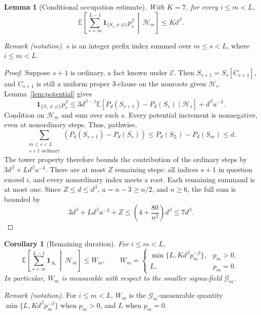 \documentclass[11pt]{article}
\newtheorem{lemma}[theorem]{Lemma}
\newtheorem{corollary}[theorem]{Corollary}
\theoremstyle{remark}
\newcommand{\E}{\mathbb E}
\newcommand{\ind}{\mathbf 1}
\newcommand{\cE}{\mathcal E}
\newcommand{\cG}{\mathcal G}
\newcommand{\cH}{\mathcal H}
\numberwithin{equation}{section}
\begin{document}
\begin{lemma}[Conditional occupation estimate]
\label{lem:occupation}
With $K=7$, for every $i\le m<L$,
\begin{equation}
 \E\left[\sum_{s=m}^{L-1}\ind_{\{S_s\ne\varnothing\}}p_s^\beta
                         \,\middle|\,\cH_m\right]
 \le Kd^\beta.
 \label{eq:occupation}
\end{equation}
\end{lemma}

\noindent\textit{Remark (notation).} $s$ is an integer prefix index summed over $m\le s<L$, where $i\le m<L$.


\begin{proof}
Suppose $s+1$ is ordinary, a fact known under $\cE$.
Then $S_{s+1}=S_s[C_{s+1}]$, and $C_{s+1}$ is still a uniform proper
3-clause on the nonroots given $\cH_s$. Lemma~\ref{lem:potential} gives
\[
 \ind_{\{S_s\ne\varnothing\}}p_s^\beta
 \le3d^{\beta-1}\E[P_d(S_{s+1})-P_d(S_s)\mid\cH_s]
          +d^\beta u^{-3}.
\]
Condition on $\cH_m$ and sum over such $s$. Every potential increment
is nonnegative, even at nonordinary steps. Thus, pathwise,
\[
 \sum_{\substack{m\le s<L\\s+1\text{ ordinary}}}
       (P_d(S_{s+1})-P_d(S_s))
 \le P_d(S_L)-P_d(S_m)\le d.
\]
The tower property therefore bounds the contribution of the ordinary
steps by $3d^\beta+Ld^\beta u^{-3}$.
There are at most $Z$ remaining steps: all indices $s+1$ in question
exceed $i$, and every nonordinary index meets a root.
Each remaining summand is at most one. Since $Z\le d\le d^\beta$,
$u=n-3\ge n/2$, and $n\ge6$, the full sum is bounded by
\[
 3d^\beta+Ld^\beta u^{-3}+Z
 \le \left(4+\frac{80}{n^2}\right)d^\beta\le7d^\beta.
\]
\end{proof}

\begin{corollary}[Remaining duration]
\label{cor:duration}
For $i\le m<L$,
\begin{equation}
 \E\left[\sum_{s=m}^{L-1}\ind_{A_s}\,\middle|\,\cH_m\right]\le W_m,
 \qquad
 W_m=\begin{cases}
 \min\{L,Kd^\beta p_m^{-\beta}\},&p_m>0,\\
 L,&p_m=0.
 \end{cases}
 \label{eq:duration}
\end{equation}
In particular, $W_m$ is measurable with respect to the smaller
sigma-field $\cG_m$.
\end{corollary}

\noindent\textit{Remark (notation).} For $i\le m<L$, $W_m$ is the $\cG_m$-measurable quantity $\min\{L,Kd^\beta p_m^{-\beta}\}$ when $p_m>0$, and $L$ when $p_m=0$.
\end{document}
